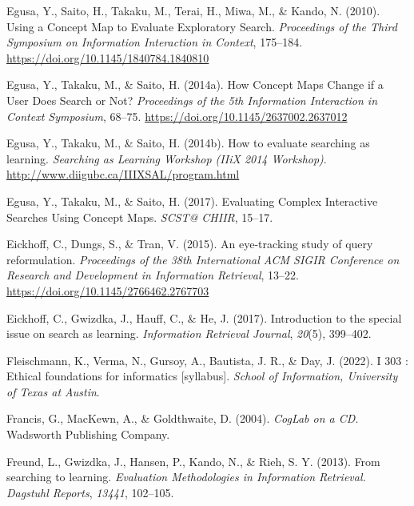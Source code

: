 \documentclass[letterpaper, nobind]{templates/ociamthesis}
\newlength{\cslhangindent}
\newenvironment{CSLReferences}[2] %
 {%
  \setlength{\parindent}{0pt}
  \ifodd #1
  \let\oldpar\par
  \def\par{\hangindent=\cslhangindent\oldpar}
  \fi
  \setlength{\parskip}{1mm}
  \setlength{\baselineskip}{6mm}
 }%
 {}
\begin{document}
\begin{CSLReferences}{1}{0}
\leavevmode{}%
Egusa, Y., Saito, H., Takaku, M., Terai, H., Miwa, M., \& Kando, N. (2010). Using a {Concept Map} to {Evaluate Exploratory Search}. \emph{Proceedings of the {Third Symposium} on {Information Interaction} in {Context}}, 175--184. \url{https://doi.org/10.1145/1840784.1840810}

\leavevmode{}%
Egusa, Y., Takaku, M., \& Saito, H. (2014a). How {Concept Maps Change} if a {User Does Search} or {Not}? \emph{Proceedings of the 5th {Information Interaction} in {Context Symposium}}, 68--75. \url{https://doi.org/10.1145/2637002.2637012}

\leavevmode{}%
Egusa, Y., Takaku, M., \& Saito, H. (2014b). How to evaluate searching as learning. \emph{Searching as {Learning Workshop} ({IIiX} 2014 Workshop)}. \url{http://www.diigubc.ca/IIIXSAL/program.html}

\leavevmode{}%
Egusa, Y., Takaku, M., \& Saito, H. (2017). Evaluating {Complex Interactive Searches Using Concept Maps}. \emph{{SCST}@ {CHIIR}}, 15--17.

\leavevmode{}%
Eickhoff, C., Dungs, S., \& Tran, V. (2015). An eye-tracking study of query reformulation. \emph{Proceedings of the 38th International {ACM SIGIR} Conference on Research and Development in Information Retrieval}, 13--22. \url{https://doi.org/10.1145/2766462.2767703}

\leavevmode{}%
Eickhoff, C., Gwizdka, J., Hauff, C., \& He, J. (2017). Introduction to the special issue on search as learning. \emph{Information Retrieval Journal}, \emph{20}(5), 399--402.

\leavevmode{}%
Fleischmann, K., Verma, N., Gursoy, A., Bautista, J. R., \& Day, J. (2022). I 303 : Ethical foundations for informatics {[}syllabus{]}. \emph{School of Information, University of Texas at Austin}.

\leavevmode{}%
Francis, G., MacKewn, A., \& Goldthwaite, D. (2004). \emph{{CogLab} on a {CD}}. {Wadsworth Publishing Company}.

\leavevmode{}%
Freund, L., Gwizdka, J., Hansen, P., Kando, N., \& Rieh, S. Y. (2013). From searching to learning. \emph{Evaluation Methodologies in Information Retrieval. Dagstuhl Reports}, \emph{13441}, 102--105.


\end{CSLReferences}
\end{document}
